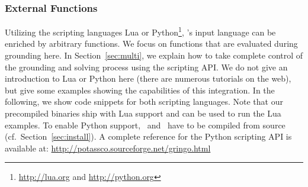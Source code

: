\subsubsection{External Functions}\label{subsec:lang:extfun}
%
%
%
%
Utilizing the scripting languages Lua or Python\footnote{\url{http://lua.org} and \url{http://python.org}},
\gringo's input language can be enriched by arbitrary functions.
We focus on functions that are evaluated during grounding here.
In Section~\ref{sec:multi},
we explain how to take complete control of the grounding and solving process using the scripting API.
We do not give an introduction to Lua or Python here (there are numerous tutorials on the web),
but give some examples showing the capabilities of this integration.
In the following, we show code snippets for both scripting languages.
Note that our precompiled binaries ship with Lua support and can be used to run the Lua examples.
To enable Python support, \gringo\ and \clingo\ have to be compiled from source (cf.\ Section~\ref{sec:install}).
A complete reference for the Python scripting API is available at: \url{http://potassco.sourceforge.net/gringo.html}
